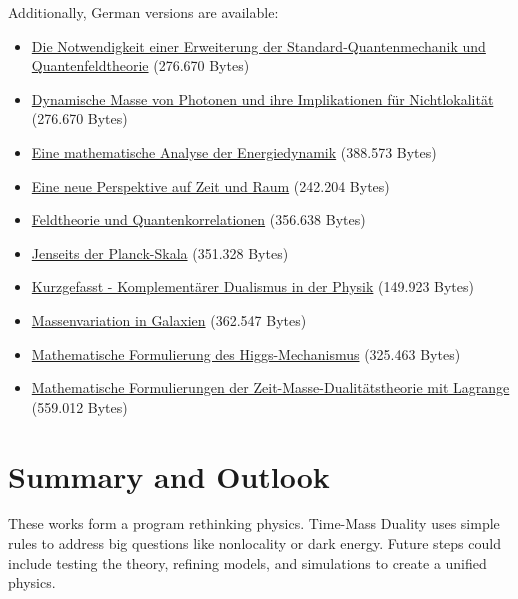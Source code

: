 \documentclass[a4paper,12pt]{article}
\newcommand{\repobase}{https://github.com/jpascher/T0-Time-Mass-Duality/tree/main/2/}
\begin{document}
	Additionally, German versions are available:
	\begin{itemize}
		\item \small\href{\repobase/pdf/Deutsch/Die Notwendigkeit einer Erweiterung der Standard-Quantenmechanik und Quantenfeldtheorie.pdf}{Die Notwendigkeit einer Erweiterung der Standard-Quantenmechanik und Quantenfeldtheorie} (276.670 Bytes)
		\item \small\href{\repobase/pdf/Deutsch/Dynamische Masse von Photonen und ihre Implikationen für Nichtlokalität.pdf}{Dynamische Masse von Photonen und ihre Implikationen für Nichtlokalität} (276.670 Bytes)
		\item \small\href{\repobase/pdf/Deutsch/Eine mathematische Analyse der Energiedynamik.pdf}{Eine mathematische Analyse der Energiedynamik} (388.573 Bytes)
		\item \small\href{\repobase/pdf/Deutsch/Eine neue Perspektive auf Zeit und Raum Johann Paschers revolutionäre Ideen.pdf}{Eine neue Perspektive auf Zeit und Raum} (242.204 Bytes)
		\item \small\href{\repobase/pdf/Deutsch/Feldtheorie und Quantenkorrelationen.pdf}{Feldtheorie und Quantenkorrelationen} (356.638 Bytes)
		\item \small\href{\repobase/pdf/Deutsch/Jenseits der Planck-Skala.pdf}{Jenseits der Planck-Skala} (351.328 Bytes)
		\item \small\href{\repobase/pdf/Deutsch kurzgefasst/Kurzgefasst - Komplementärer Dualismus in der Physik - Von Welle-Teilchen zum Zeit-Masse-Konzept.pdf}{Kurzgefasst - Komplementärer Dualismus in der Physik} (149.923 Bytes)
		\item \small\href{\repobase/pdf/Deutsch/Massenvariation in Galaxien.pdf}{Massenvariation in Galaxien} (362.547 Bytes)
		\item \small\href{\repobase/pdf/Deutsch/Mathematische Formulierung des Higgs-Mechanismus in der Zeit-Masse-Dualität.pdf}{Mathematische Formulierung des Higgs-Mechanismus} (325.463 Bytes)
		\item \small\href{\repobase/pdf/Deutsch/Mathematische Formulierungen der Zeit-Masse-Dualitätstheorie mit Lagrange.pdf}{Mathematische Formulierungen der Zeit-Masse-Dualitätstheorie mit Lagrange} (559.012 Bytes)
	\end{itemize}
	
	\section{Summary and Outlook}
	
	These works form a program rethinking physics. Time-Mass Duality uses simple rules to address big questions like nonlocality or dark energy. Future steps could include testing the theory, refining models, and simulations to create a unified physics.
	
\end{document}
